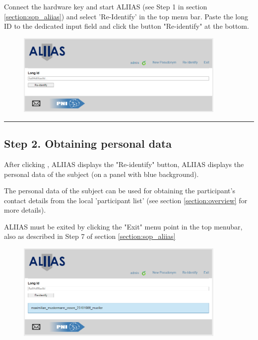 Connect the hardware key and start ALIIAS (see Step 1 in section \ref{section:sop_aliias}) and select 'Re-Identify' in the top menu bar. 
Paste the long ID to the dedicated input field and click the button "Re-identify" at the bottom.

\small\setlength\fboxsep{5pt}\setlength\fboxrule{1pt}

\small\setlength\fboxsep{5pt}\setlength\fboxrule{1pt}
\large

\begin{figure}[H]
\includegraphics[width=0.9\textwidth]{docs/fig/06_reidentify.PNG}
\end{figure}

\par\noindent\rule{\textwidth\color{pniblue}}{0.4pt}
\subsection*{Step 2. Obtaining personal data}

After clicking , ALIIAS displays the "Re-identify" button, ALIIAS displays the personal data of the subject (on a panel with blue background).

The personal data of the subject can be used for obtaining the participant's contact details from the local 'participant list' (see section \ref{section:overview} for more details).

ALIIAS must be exited by clicking the "Exit" menu point in the top menubar, also as described in Step 7 of section \ref{section:sop_aliias}

\begin{figure}[H]
\includegraphics[width=0.9\textwidth]{docs/fig/07_reidentify_result.PNG}
\end{figure}
